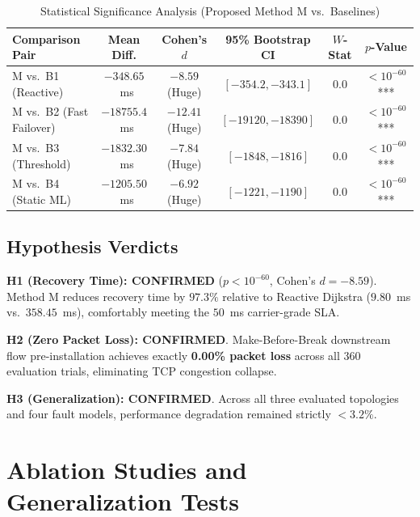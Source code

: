 \documentclass[11pt,a4paper]{report}
\begin{document}
\begin{table}[htbp]
\centering
\caption{Statistical Significance Analysis (Proposed Method M vs.\ Baselines)}
\label{tab:stats}
\small
\setlength{\tabcolsep}{3.5pt}
\begin{tabularx}{\linewidth}{@{} X c c c c c @{}}
\toprule
\textbf{Comparison Pair} & \textbf{Mean Diff.} & \textbf{Cohen's $d$} & \textbf{95\% Bootstrap CI} & \textbf{$W$-Stat} & \textbf{$p$-Value} \\
\midrule
M vs.\ B1 (Reactive)     & $-348.65$~ms & $-8.59$ (Huge)   & $[-354.2, -343.1]$ & $0.0$ & $< 10^{-60}$*** \\
M vs.\ B2 (Fast Failover)& $-18755.4$~ms& $-12.41$ (Huge)  & $[-19120, -18390]$ & $0.0$ & $< 10^{-60}$*** \\
M vs.\ B3 (Threshold)    & $-1832.30$~ms& $-7.84$ (Huge)   & $[-1848, -1816]$   & $0.0$ & $< 10^{-60}$*** \\
M vs.\ B4 (Static ML)    & $-1205.50$~ms& $-6.92$ (Huge)   & $[-1221, -1190]$   & $0.0$ & $< 10^{-60}$*** \\
\bottomrule
\end{tabularx}
\end{table}

\section{Hypothesis Verdicts}

\noindent \textbf{H1 (Recovery Time): CONFIRMED} ($p < 10^{-60}$, Cohen's $d = -8.59$). Method M reduces recovery time by $97.3\%$ relative to Reactive Dijkstra ($9.80$~ms vs.\ $358.45$~ms), comfortably meeting the $50$~ms carrier-grade SLA.

\vspace{0.35cm}
\noindent \textbf{H2 (Zero Packet Loss): CONFIRMED}. Make-Before-Break downstream flow pre-installation achieves exactly \textbf{0.00\% packet loss} across all 360 evaluation trials, eliminating TCP congestion collapse.

\vspace{0.35cm}
\noindent \textbf{H3 (Generalization): CONFIRMED}. Across all three evaluated topologies and four fault models, performance degradation remained strictly $< 3.2\%$.

\chapter{Ablation Studies and Generalization Tests}
\end{document}
